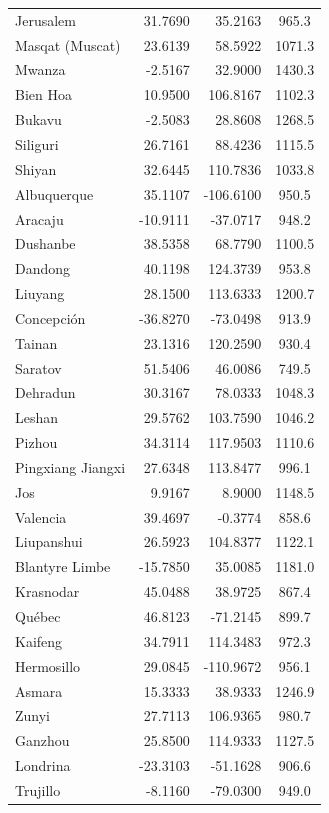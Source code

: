 \begin{longtable}{lrrc}
Jerusalem & 31.7690 & 35.2163 & 965.3 \\
Masqat (Muscat) & 23.6139 & 58.5922 & 1071.3 \\
Mwanza & -2.5167 & 32.9000 & 1430.3 \\
Bien Hoa & 10.9500 & 106.8167 & 1102.3 \\
Bukavu & -2.5083 & 28.8608 & 1268.5 \\
Siliguri & 26.7161 & 88.4236 & 1115.5 \\
Shiyan & 32.6445 & 110.7836 & 1033.8 \\
Albuquerque & 35.1107 & -106.6100 & 950.5 \\
Aracaju & -10.9111 & -37.0717 & 948.2 \\
Dushanbe & 38.5358 & 68.7790 & 1100.5 \\
Dandong & 40.1198 & 124.3739 & 953.8 \\
Liuyang & 28.1500 & 113.6333 & 1200.7 \\
Concepción & -36.8270 & -73.0498 & 913.9 \\
Tainan & 23.1316 & 120.2590 & 930.4 \\
Saratov & 51.5406 & 46.0086 & 749.5 \\
Dehradun & 30.3167 & 78.0333 & 1048.3 \\
Leshan & 29.5762 & 103.7590 & 1046.2 \\
Pizhou & 34.3114 & 117.9503 & 1110.6 \\
Pingxiang  Jiangxi & 27.6348 & 113.8477 & 996.1 \\
Jos & 9.9167 & 8.9000 & 1148.5 \\
Valencia & 39.4697 & -0.3774 & 858.6 \\
Liupanshui & 26.5923 & 104.8377 & 1122.1 \\
Blantyre Limbe & -15.7850 & 35.0085 & 1181.0 \\
Krasnodar & 45.0488 & 38.9725 & 867.4 \\
Québec & 46.8123 & -71.2145 & 899.7 \\
Kaifeng & 34.7911 & 114.3483 & 972.3 \\
Hermosillo & 29.0845 & -110.9672 & 956.1 \\
Asmara & 15.3333 & 38.9333 & 1246.9 \\
Zunyi & 27.7113 & 106.9365 & 980.7 \\
Ganzhou & 25.8500 & 114.9333 & 1127.5 \\
Londrina & -23.3103 & -51.1628 & 906.6 \\
Trujillo & -8.1160 & -79.0300 & 949.0 \\

\end{longtable}
